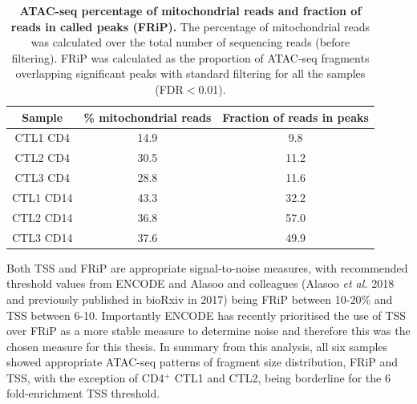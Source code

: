 \begin{table}[htbp]
\centering
\begin{tabular}{@{} c c c}
\toprule
\textbf{Sample} & \textbf{\% mitochondrial reads} & \textbf{Fraction of reads in peaks} \\
\midrule
\midrule
CTL1 CD4 & 14.9 & 9.8 \\
CTL2 CD4 & 30.5 & 11.2 \\
CTL3 CD4 & 28.8 & 11.6 \\
CTL1 CD14 & 43.3 & 32.2 \\
CTL2 CD14 & 36.8 & 57.0 \\
CTL3 CD14 & 37.6 & 49.9 \\
\bottomrule
\end{tabular}
\medskip %
\caption[ATAC-seq percentage of mitochondrial reads and fraction of reads in called peaks (FRiP).]{\textbf{ATAC-seq percentage of mitochondrial reads and fraction of reads in called peaks (FRiP).} The percentage of mitochondrial reads was calculated over the total number of sequencing reads (before filtering). FRiP was calculated as the proportion of ATAC-seq fragments overlapping significant peaks with standard filtering for all the samples (FDR$<$0.01).}
\label{tab:ATAC_MT_fraction_reads_in_peaks}
\end{table}



Both TSS and FRiP are appropriate signal-to-noise measures, with recommended threshold values from ENCODE and Alasoo and colleagues (Alasoo \textit{et al.} 2018 and previously published in bioRxiv in 2017) being FRiP between 10-20\% and TSS between 6-10. Importantly ENCODE has recently prioritised the use of TSS over FRiP as a more stable measure to determine noise and therefore this was the chosen measure for this thesis. In summary from this analysis, all six samples showed appropriate ATAC-seq patterns of fragment size distribution, FRiP and TSS, with the exception of CD4$^+$ CTL1 and CTL2, being borderline for the 6 fold-enrichment TSS threshold. 



